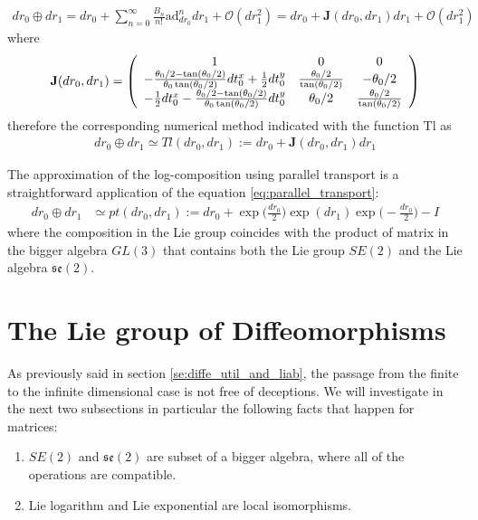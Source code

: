 \begin{align}
dr_{0}\oplus dr_{1}
=
dr_{0}
+
\sum_{n=0}^{\infty} \frac{B_{n}}{n!} \text{ad}_{dr_{0}}^{ n} 
dr_{1}
+
\mathcal{O}(dr_{1}^2)
=
dr_{0}
+
\mathbf{J}(dr_{0}, dr_{1})
dr_{1}
+
\mathcal{O}(dr_{1}^2)
\end{align}
where 
\begin{align*}
\mathbf{J}(dr_{0}, dr_{1})
=
\left (
\begin{array} {c c c}
1            &  0        &      0
\\
-\frac{\theta_0/2 - \tan(\theta_0/2)}{\theta_0\tan(\theta_0/2)}  dt^{x}_0 + \frac{1}{2}dt^{y}_0       
&  \frac{\theta_0 /2}{\tan(\theta_0/2)} 
& - \theta_0/2 
\\
-  \frac{1}{2} dt^{x}_0 -\frac{\theta_0/2 - \tan(\theta_0/2)}{\theta_0\tan(\theta_0/2)} dt^{y}_0       
& \theta_0/2 
&  \frac{\theta_0 /2}{\tan(\theta_0/2)}
\end{array}
\right )
\end{align*}
therefore the corresponding numerical method indicated with the function $\text{Tl}$ as
\begin{align}\label{eq:taylor_se2}
dr_{0}\oplus dr_{1}
\simeq
Tl(dr_{0}, dr_{1})
:=
dr_{0}
+
\mathbf{J}(dr_{0}, dr_{1})
dr_{1}
\end{align}

The approximation of the log-composition using parallel transport is a straightforward application of the equation \ref{eq:parallel_transport}: 
\begin{align}\label{eq:parallel_transport_se2}
dr_{0}\oplus dr_{1}
&\simeq
pt(dr_{0}, dr_{1}) 
:=
dr_{0}
+
\exp\big(\frac{dr_{0}}{2}\big)   
\exp(dr_{1}) 
\exp\big(-\frac{dr_{0}}{2}\big)
-
I
\end{align}
where the composition in the Lie group coincides with the product of matrix in the bigger algebra $GL(3)$ that contains both the Lie group $SE(2)$ and the Lie algebra $\mathfrak{se}(2)$.


\section{The Lie group of Diffeomorphisms}\label{se:svf}


As previously said in section \ref{se:diffe_util_and_liab}, the passage from the finite to the infinite dimensional case is not free of deceptions. We will investigate in the next two subsections in particular the following facts that happen for matrices:
\begin{enumerate}
	\item $SE(2)$ and $\mathfrak{se}(2)$ are subset of a bigger algebra, where all of the operations are compatible.
	\item Lie logarithm and Lie exponential are local isomorphisms.
\end{enumerate}


